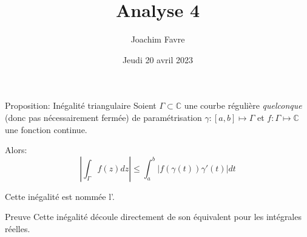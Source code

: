 \documentclass[a4paper]{article}
\title{Analyse 4}
\author{Joachim Favre}
\date{Jeudi 20 avril 2023}
\begin{document}
\maketitle


\begin{parag}{Proposition: Inégalité triangulaire}
    Soient $\Gamma \subset \mathbb{C}$ une courbe régulière \textit{quelconque} (donc pas nécessairement fermée) de paramétrisation $\gamma: \left[a, b\right] \mapsto \Gamma$ et $f: \Gamma \mapsto \mathbb{C}$ une fonction continue.

    Alors: 
    \[\left|\int_{\Gamma} f\left(z\right)dz\right| \leq \int_{a}^{b} \left|f\left(\gamma\left(t\right)\right) \gamma'\left(t\right)\right| dt\]
    
    Cette inégalité est nommée l'.

    \begin{subparag}{Preuve}
        Cette inégalité découle directement de son équivalent pour les intégrales réelles.
    \end{subparag}
\end{parag}
\end{document}

